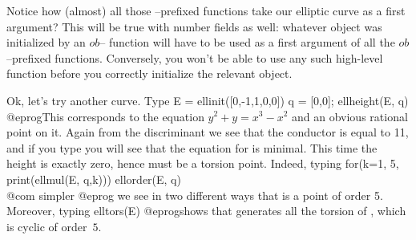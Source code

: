 Notice how (almost) all those --prefixed functions take our
elliptic curve as a first argument? This will be true with number
fields as well: whatever object was initialized by an $ob$--
function will have to be used as a first argument of all the
$ob$--prefixed functions. Conversely, you won't be able to use any
such high-level function before you correctly initialize the relevant
object. \smallskip

Ok, let's try another curve. Type
\bprog
  E = ellinit([0,-1,1,0,0])
  q = [0,0]; ellheight(E, q)
@eprog\noindent This corresponds to the equation $y^2+y = x^3-x^2$ and an
obvious rational point on it. Again from the discriminant we see that the
conductor is equal to 11, and if you type  you will
see that the equation  for  is minimal. This time the height is
exactly zero, hence  must be a torsion point. Indeed, typing
\bprog
  for(k=1, 5, print(ellmul(E, q,k)))
  ellorder(E, q)   \\@com simpler
@eprog\noindent
we see in two different ways that  is a point of order 5. Moreover,
typing
\bprog
  elltors(E)
@eprog\noindent shows that  generates all the torsion of ,
which is cyclic of order~$5$. \smallskip

